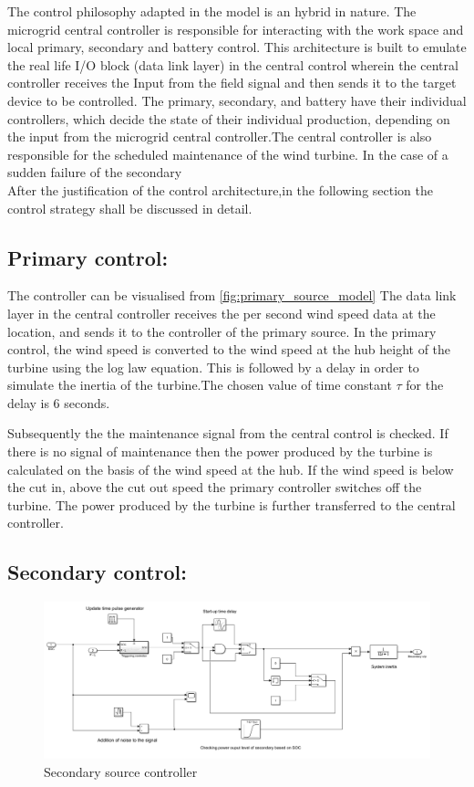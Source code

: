 \noindent The control philosophy adapted in the model is an hybrid in nature. The microgrid central controller is responsible for interacting with the work space and local primary, secondary and battery control. This architecture is built to emulate the real life I/O block (data link layer) in the central control wherein the central controller receives the Input from the field signal and then sends it to the target device to be controlled. The primary, secondary, and battery have their individual controllers, which decide the state of their individual production, depending on the input from the microgrid central controller.The central controller is also responsible for the scheduled maintenance of the wind turbine. In the case of a sudden failure of the secondary  \\

\noindent After the justification of the control architecture,in the following section  the control strategy shall be discussed in detail. \\

\subsection{Primary control:}
The controller can be visualised from \ref{fig:primary_source_model}
The data link layer in the central controller
receives the per second wind speed data at the location, and sends it to the  controller of the primary source. In the primary control, the wind speed is converted to the wind speed at the hub height of the turbine using the log law equation. This is followed by a delay in order to simulate the inertia of the turbine.The chosen value of time constant $ \tau $ for the delay is 6 seconds.

\noindent Subsequently the the maintenance signal from the central control is checked. If there is no signal of maintenance then the power produced by the turbine is calculated on the basis of the wind speed at the hub. If the wind speed is below the cut in, above the cut out speed the primary controller switches off the turbine. The power produced by the turbine is further transferred to the central controller. 

\subsection{Secondary control:}
\begin{figure}[H]
    \centering
    \includegraphics[width = 1 \linewidth]{Final_report/Images/secondary_source_controller.PNG}
    \caption{Secondary source controller}
    \label{fig:seconday_source_controller}
\end{figure}

